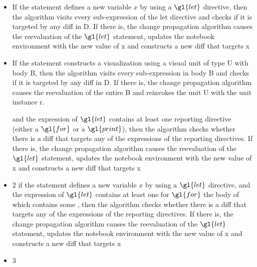 \begin{itemize}
\item If the statement defines a new variable $x$ by using a $\gl{let}$ directive, then the algorithm visits every sub-expression of the let directive and checks if it is targeted by any diff in D. If there is, the change propagation algorithm causes the reevaluation of the $\gl{let}$ statement, updates the notebook environment with the new value of x and constructs a new diff that targets x

\item If the statement constructs a visualization using a visual unit of type U with body B, then the algorithm visits every sub-expression in body B and checks if it is targeted by any diff in D. If there is, the change propagation algorithm causes the reevaluation of the entire B and reinvokes the unit U with the unit instance r.

and the expression of $\gl{let}$ contains at least one reporting directive (either a $\gl{for}$ or a $\gl{print}$), then the algorithm checks whether there is a diff that targets any of the expressions of the reporting directives. If there is, the change propagation algorithm causes the reevaluation of the $\gl{let}$ statement, updates the notebook environment with the new value of x and constructs a new diff that targets x
\item 2 if the statement defines a new variable $x$ by using a $\gl{let}$ directive, and the expression of $\gl{let}$ contains at least one for $\gl{for}$ the body of which contains some , then the algorithm checks whether there is a diff that targets any of the expressions of the reporting directives. If there is, the change propagation algorithm causes the reevaluation of the $\gl{let}$ statement, updates the notebook environment with the new value of x and constructs a new diff that targets x
\item 3

\end{itemize}

